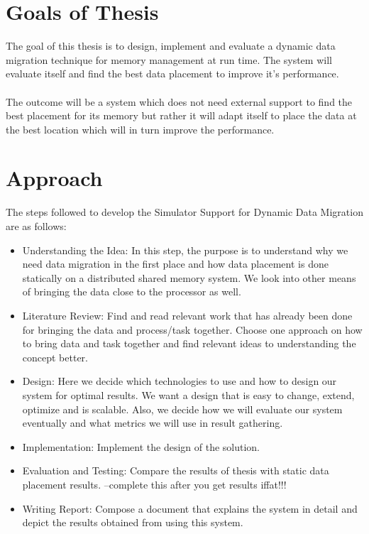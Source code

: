 \documentclass{listhesis}
\begin{document}
\section{Goals of Thesis}
The goal of this thesis is to design, implement and evaluate a dynamic data migration technique for memory management at run time. The system will evaluate itself and find the best data placement to improve it's performance. \\
\\
The outcome will be a system which does not need external support to find the best placement for its memory but rather it will adapt itself to place the data at the best location which will in turn improve the performance. 
\section{Approach}
The steps followed to develop the Simulator Support for Dynamic Data Migration are as follows:
\begin{itemize}
  \item Understanding the Idea: In this step, the purpose is to understand why we need data migration in the first place and how data placement is done statically on a distributed shared memory system. We look into other means of bringing the data close to the processor as well. 
  \item Literature Review: Find and read relevant work that has already been done for bringing the data and process/task together. Choose one approach on how to bring data and task together and find relevant ideas to understanding the concept better. 
  \item Design: Here we decide which technologies to use and how to design our system for optimal results. We want a design that is easy to change, extend, optimize and is scalable. Also, we decide how we will evaluate our system eventually and what metrics we will use in result gathering. 
  \item Implementation: Implement the design of the solution. 
  \item Evaluation and Testing: Compare the results of thesis with static data placement results. --complete this after you get results iffat!!!
  \item Writing Report: Compose a document that explains the system in detail and depict the results obtained from using this system.
\end{itemize}
\end{document}
